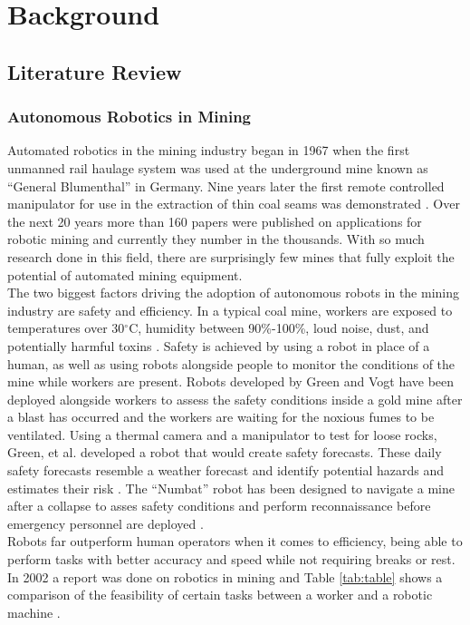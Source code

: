 \chapter{Background}
\label{chap:background}
\section{Literature Review}
\subsection{Autonomous Robotics in Mining}
Automated robotics in the mining industry began in 1967 when the first unmanned rail haulage system was used at the underground mine known as ``General Blumenthal'' in Germany. Nine years later the first remote controlled manipulator for use in the extraction of thin coal seams was demonstrated \cite{mani}. Over the next 20 years more than 160 papers were published on applications for robotic mining and currently they number in the thousands. With so much research done in this field, there are surprisingly few mines that fully exploit the potential of automated mining equipment.\\

The two biggest factors driving the adoption of autonomous robots in the mining industry are safety and efficiency. In a typical coal mine, workers are exposed to temperatures over 30$^\circ$C, humidity between 90\%-100\%, loud noise, dust, and potentially harmful toxins \cite{temp}. Safety is achieved by using a robot in place of a human, as well as using robots alongside people to monitor the conditions of the mine while workers are present. Robots developed by Green \cite{green} and Vogt \cite{vogt} have been deployed alongside workers to assess the safety conditions inside a gold mine after a blast has occurred and the workers are waiting for the noxious fumes to be ventilated. Using a thermal camera and a manipulator to test for loose rocks, Green, et al. developed a robot that would create safety forecasts. These daily safety forecasts resemble a weather forecast and identify potential hazards and estimates their risk \cite{greener}. The ``Numbat'' robot has been designed to navigate a mine after a collapse to asses safety conditions and perform reconnaissance before emergency personnel are deployed \cite{numbat2}.\\

Robots far outperform human operators when it comes to efficiency, being able to perform tasks with better accuracy and speed while not requiring breaks or rest. In 2002 a report was done on robotics in mining and Table \ref{tab:table} shows a comparison of the feasibility of certain tasks between a worker and a robotic machine \cite{table}.\\

